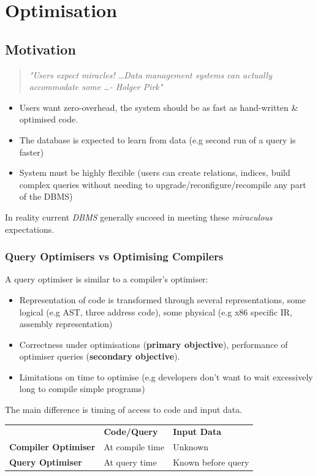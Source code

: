 \chapter{Optimisation}
\section{Motivation}
\begin{quote}
    \textit{"Users expect miracles! \dots Data management systems can actually accommodate some \dots - Holger Pirk"}
\end{quote}
\begin{itemize}
    \item Users want zero-overhead, the system should be as fast as hand-written \& optimised code.
    \item The database is expected to learn from data (e.g second run of a query is faster)
    \item System must be highly flexible (users can create relations, indices, build complex queries without needing to upgrade/reconfigure/recompile any part of the DBMS) 
\end{itemize}
In reality current \textit{DBMS} generally succeed in meeting these \textit{miraculous} expectations.

\subsection{Query Optimisers vs Optimising Compilers}
A query optimiser is similar to a compiler's optimiser:
\begin{itemize}
    \item Representation of code is transformed through several representations, some logical (e.g AST, three address code), some physical (e.g x86 specific IR, assembly representation)
    \item Correctness under optimisations (\textbf{primary objective}), performance of optimiser queries (\textbf{secondary objective}).
    \item Limitations on time to optimise (e.g developers don't want to wait excessively long to compile simple programs)
\end{itemize}
The main difference is timing of access to code and input data.
\begin{center}
    \begin{tabular}{l l l}
        & \textbf{Code/Query} & \textbf{Input Data} \\
        \textbf{Compiler Optimiser} & At compile time & Unknown \\
        \textbf{Query Optimiser} & At query time & Known before query \\
    \end{tabular}
\end{center}

